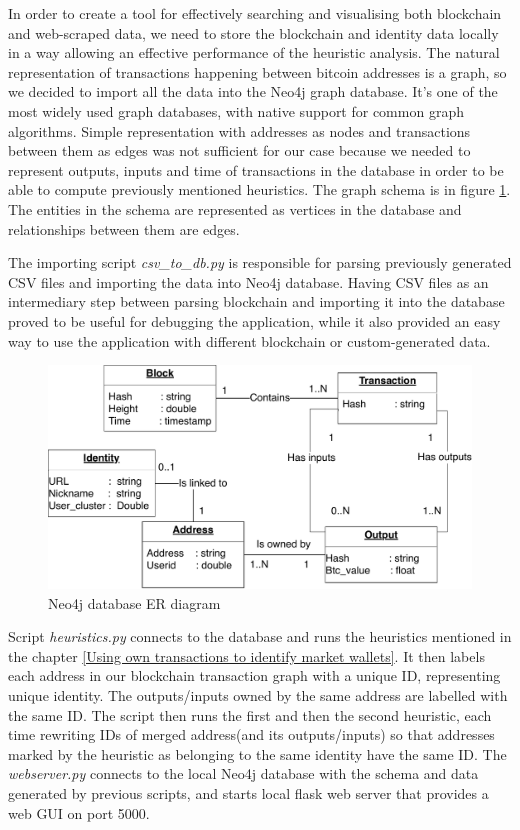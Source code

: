 \documentclass[
  digital, %
  table,   %
  lof,     %
  lot,     %
  oneside
]{fithesis3}
\begin{document}
In order to create a tool for effectively searching and visualising both blockchain and web-scraped
data, we need to store the blockchain and identity data locally in a way allowing an effective
performance of the heuristic analysis.
The natural representation of transactions happening between
bitcoin addresses is a graph, so we decided to import all the data into the Neo4j graph database. It's one of the
most widely used graph databases, with native support for common graph algorithms.
Simple representation with addresses as nodes and transactions between them as edges was not
sufficient for our case because we needed to represent
outputs, inputs and time of transactions in the database in order to be able to compute previously mentioned heuristics. 
The graph schema is in figure \ref{Neo4jschema}. The entities in the schema are represented as vertices
 in the database and relationships between them are edges.

The importing script \emph{csv\_to\_db.py} is responsible for parsing
previously generated CSV files and importing the data into Neo4j database.
Having CSV files as an intermediary step between parsing blockchain and importing it into the database
proved to be useful for debugging the application, while it also provided an easy way to
use the application with different blockchain or custom-generated data.

\begin{figure}[!htb]
    \centering
    \includegraphics[width=1\textwidth]{neo4j-schema.pdf}
    \caption{Neo4j database ER diagram}
    \label{Neo4jschema}
\end{figure}

Script \emph{heuristics.py} connects to the database and runs the heuristics mentioned in the chapter
\ref{Using own transactions to identify market wallets}.
It then labels each address in our blockchain transaction graph
with a unique ID, representing unique identity. The outputs/inputs owned by the same address are labelled
with the same ID. The script then runs the first and then the second heuristic,
each time rewriting IDs of merged address(and its outputs/inputs) so that addresses marked by the heuristic as belonging to the same identity have the same ID.
The \emph{webserver.py} connects to the local Neo4j database with the schema and data generated by previous
scripts, and starts local flask web server that provides a web GUI on port 5000.
\end{document}

